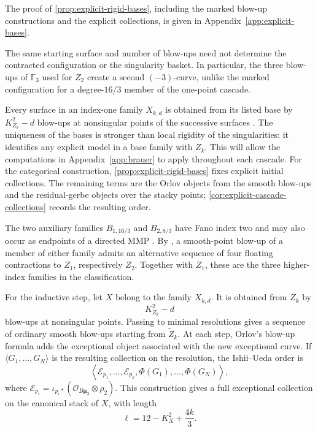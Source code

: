 \documentclass[11pt]{article}
\theoremstyle{plain}
\theoremstyle{definition}
\theoremstyle{remark}
\newcommand{\F}{\mathbb F}
\newcommand{\muthree}{\boldsymbol{\mu}_3}
\newcommand{\OO}{\mathcal O}
\begin{document}
The proof of \cref{prop:explicit-rigid-bases}, including the marked
blow-up constructions and the explicit collections, is given in
Appendix~\ref{app:explicit-bases}.

The same starting surface and number of blow-ups need not determine the
contracted configuration or the singularity basket. In particular, the three blow-ups
of \(\F_3\) used for \(Z_2\) create a second \((-3)\)-curve, unlike
the marked configuration for a degree-\(16/3\) member of the one-point
cascade.

Every surface in an index-one family \(X_{k,d}\) is obtained from its listed
base by \(K_{Z_k}^2-d\) blow-ups at nonsingular points of the successive
surfaces \cite[Corollary~8]{Corti2016}. The uniqueness of the bases is
stronger than local rigidity of the singularities: it identifies any
explicit model in a base family with \(Z_k\). This will allow the
computations in Appendix~\ref{app:brauer} to apply throughout each cascade.
For the categorical construction, \cref{prop:explicit-rigid-bases} fixes
explicit initial collections. The remaining terms are the Orlov objects
from the smooth blow-ups and the residual-gerbe objects over the stacky
points; \cref{cor:explicit-cascade-collections} records the resulting order.

The two auxiliary families \(B_{1,16/3}\) and \(B_{2,8/3}\) have Fano
index two and may also occur as endpoints of a directed MMP
\cite[Theorems~3 and~6]{Corti2016}. By \cite[Remark~9]{Corti2016}, a
smooth-point blow-up of a member of either family admits an alternative
sequence of four floating contractions to \(Z_1\), respectively \(Z_2\).
Together with \(Z_1\), these are the three higher-index families in the
classification.

For the inductive step, let \(X\) belong to the family \(X_{k,d}\). It is obtained from \(Z_k\) by
\[
K_{Z_k}^2-d
\]
blow-ups at nonsingular points. Passing to minimal resolutions gives a sequence of ordinary smooth blow-ups starting from \(\widetilde Z_k\). At each step, Orlov's blow-up formula adds the exceptional object associated with the new exceptional curve. If \(\langle G_1,\dots,G_N\rangle\) is the resulting collection on the resolution, the Ishii--Ueda order is
\[
\left\langle
\mathcal E_{p_1},\dots,\mathcal E_{p_k},
\Phi(G_1),\dots,\Phi(G_N)
\right\rangle,
\]
where \(\mathcal E_{p_i}=\iota_{p_i*}(\OO_{B\muthree}\otimes\rho_2)\). This construction gives a full exceptional collection on the canonical stack of \(X\), with length
\[
\ell=12-K_X^2+\frac{4k}{3}.
\]
\end{document}
